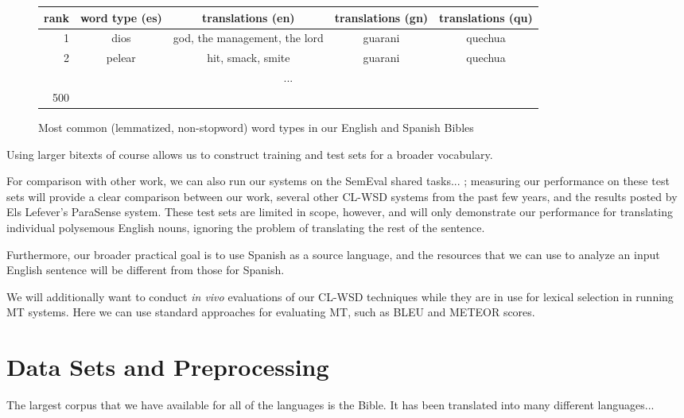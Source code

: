 \begin{figure*}
  \begin{centering}
  \begin{tabular}{|r|c|c|c|c|}
    \hline
    rank & word type (es) & translations (en) & translations (gn) & translations (qu) \\
    \hline
    1    & dios   &  god, the management, the lord & guarani & quechua \\
    2    & pelear &  hit, smack, smite             & guarani & quechua \\
    \multicolumn{5}{|c|}{...} \\ 
    500 &  & & & \\
    \hline
  \end{tabular}
  \end{centering}
  \caption{Most common (lemmatized, non-stopword) word types in our English and
  Spanish Bibles}
  \label{fig:mostcommon-es-translations}
\end{figure*}


Using larger bitexts of course allows us to construct training and test sets
for a broader vocabulary.

For comparison with other work, we can also run our systems on the SemEval
shared tasks...
\cite{task10}; measuring our performance on these test sets will provide a
clear comparison between our work, several other CL-WSD systems from the past
few years, and the results posted by Els Lefever's ParaSense system.
These test sets are limited in scope, however, and will only demonstrate our
performance for translating individual polysemous English nouns, ignoring the
problem of translating the rest of the sentence.

Furthermore, our broader practical goal is to use Spanish as a source language,
and the resources that we can use to analyze an input English sentence will be
different from those for Spanish.

We will additionally want to conduct \emph{in vivo} evaluations of our CL-WSD
techniques while they are in use for lexical selection in running MT systems.
Here we can use standard approaches for evaluating MT, such as BLEU and METEOR
scores.


\section{Data Sets and Preprocessing}

The largest corpus that we have available for all of the languages is the
Bible. It has been translated into many different languages...

